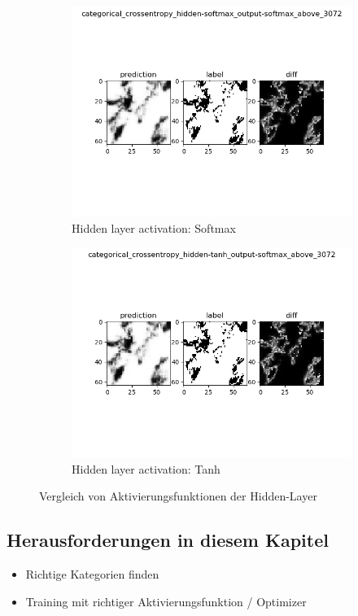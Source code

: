 \begin{figure}[ht]
\centering
\begin{subfigure}{0.5\textwidth}
\centering
\includegraphics[width=\linewidth]{pics/categorical_crossentropy_hidden-softmax_output-softmax_above_3072}
\caption{Hidden layer activation: Softmax}
\label{fig:hiddenActivationSoftmax}
\end{subfigure}%
\begin{subfigure}{0.5\textwidth}
\centering
\includegraphics[width=\linewidth]{pics/categorical_crossentropy_hidden-tanh_output-softmax_above_3072}
\caption{Hidden layer activation: Tanh}
\label{fig:hiddenActivationTanh}
\end{subfigure}%
\caption{Vergleich von Aktivierungsfunktionen der Hidden-Layer}
\label{fig:activatinHidden}
\end{figure}


\subsection{Herausforderungen in diesem Kapitel}
\begin{itemize}
\item Richtige Kategorien finden
\item Training mit richtiger Aktivierungsfunktion / Optimizer
\end{itemize}

